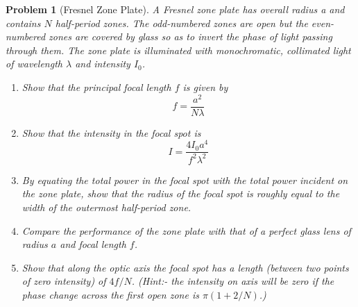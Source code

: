 \documentclass[a4paper]{article}
\theoremstyle{new}
\newtheorem{qns}{Problem}[section]
\begin{document}
\newpage
\begin{qns}[Fresnel Zone Plate]
A Fresnel zone plate has overall radius a and contains $N$ half-period zones. The odd-numbered zones are open but the even-numbered zones are covered by glass so as to invert the phase of light passing through them. The zone plate is illuminated with monochromatic, collimated light of wavelength $\lambda$ and intensity $I_0$.
\begin{enumerate}[label=(\alph*)]
    \item Show that the principal focal length $f$ is given by
$$f=\frac{a^2}{N\lambda}$$
\item Show that the intensity in the focal spot is
$$I=\frac{4I_0a^4}{f^2\lambda^2}$$
\item By equating the total power in the focal spot with the total power incident on the zone plate, show that the radius of the focal spot is roughly equal to the width of the outermost half-period zone.
\item  Compare the performance of the zone plate with that of a perfect glass lens of radius $a$ and focal length $f$.
\item Show that along the optic axis the focal spot has a length (between two points of zero intensity) of $4f/N$. (Hint:- the intensity on axis will be zero if the phase change across the first open zone is $\pi(1+2/N)$.)
\end{enumerate}
\end{qns}
\end{document}
